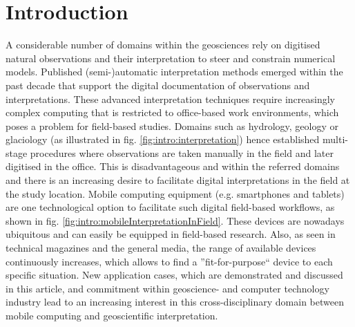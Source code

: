 \documentclass[review]{elsarticle}
\begin{document}
\linenumbers

\section{Introduction}
\label{sec:introduction}

A considerable number of domains within the geosciences rely on digitised natural observations and their interpretation to steer and constrain numerical models. Published (semi-)automatic interpretation methods \cite{Nyberg2015,Ruiu2015} emerged within the past decade that support the digital documentation of observations and interpretations. These advanced interpretation techniques require increasingly complex computing that is restricted to office-based work environments, which poses a problem for field-based studies. Domains such as hydrology, geology or glaciology (as illustrated in fig. \ref{fig:intro:interpretation}) hence established multi-stage procedures where observations are taken manually in the field and later digitised in the office. This is disadvantageous and within the referred domains and there is an increasing desire to facilitate digital interpretations in the field at the study location. Mobile computing equipment (e.g. smartphones and tablets) are one technological option to facilitate such digital field-based workflows, as shown in fig. \ref{fig:intro:mobileInterpretationInField}. These devices are nowadays ubiquitous and can easily be equipped in field-based research. Also, as seen in technical magazines and the general media, the range of available devices continuously increases, which allows to find a ''fit-for-purpose`` device to each specific situation. New application cases, which are demonstrated and discussed in this article, and commitment within geoscience- and computer technology industry lead to an increasing interest in this cross-disciplinary domain between mobile computing and geoscientific interpretation.

\end{document}
